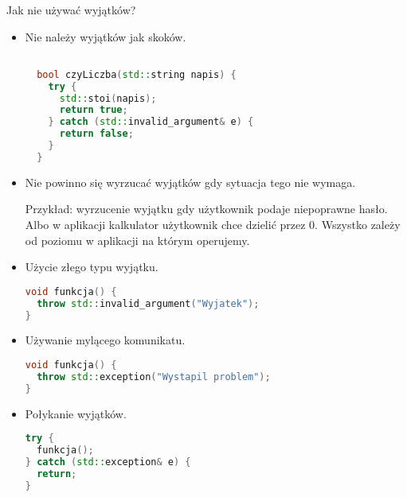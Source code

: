 \documentclass[notheorems, aspectratio=54]{beamer}
\begin{document}
\begin{frame}
	
	Jak nie używać wyjątków?
	
	\begin{itemize}
		\item Nie należy wyjątków jak skoków.
		      
		      \begin{lstlisting}[language=C++]

  bool czyLiczba(std::string napis) {
    try {
      std::stoi(napis);
      return true;
    } catch (std::invalid_argument& e) {
      return false;
    }
  }
		      \end{lstlisting}
		        
		\item Nie powinno się wyrzucać wyjątków gdy sytuacja tego nie wymaga.
		      
		      Przykład: wyrzucenie wyjątku gdy użytkownik podaje niepoprawne hasło.
		      Albo w aplikacji kalkulator użytkownik chce dzielić przez 0.
		      Wszystko zależy od poziomu w aplikacji na którym operujemy.
		      
		\item Użycie złego typu wyjątku.
		      
		      \begin{lstlisting}[language=C++]
void funkcja() {
  throw std::invalid_argument("Wyjatek");
}
		      \end{lstlisting}
		      
		\item Używanie mylącego komunikatu.
		      
		      \begin{lstlisting}[language=C++]
void funkcja() {
  throw std::exception("Wystapil problem");
}
		      \end{lstlisting}
		      
		\item Połykanie wyjątków.
		      
		      \begin{lstlisting}[language=C++]
try {
  funkcja();
} catch (std::exception& e) {
  return;
}
		      \end{lstlisting}
		      
	\end{itemize}
	
\end{frame}
\end{document}
